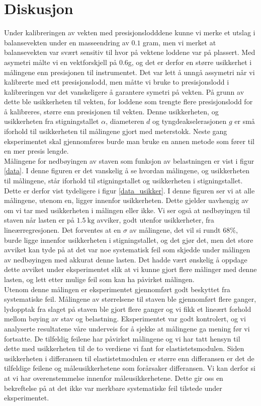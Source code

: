 \documentclass[%
 reprint,
 amsmath,amssymb,
 aps,
 norsk,
 booktabs
]{revtex4-1}
\begin{document}
\section{Diskusjon}
Under kalibreringen av vekten med presisjonslodddene kunne vi merke et utslag i balansevekten under en masseendring av $0.1$ gram, men vi merket at balansevekten var svært sensitiv til hvor på vektene loddene var på plassert. Med asymetri målte vi en vektforskjell på $0.6$g, og det er derfor en større usikkerhet i målingene enn presisjonen til instrumentet. Det var lett å unngå assymetri når vi kalibrerte med ett presisjonslodd, men måtte vi bruke to presisjonslodd i kalibreringen var det vanskeligere å garantere symetri på vekten. På grunn av dette ble usikkerheten til vekten, for loddene som trengte flere presisjonslodd for å kalibreres, større enn presisjonen til vekten. Denne usikkerheten, og usikkerheten fra stigningstallet $\alpha$, diameteren $d$ og tyngdeakselerasjonen $g$ er små iforhold til usikkerheten til målingene gjort med meterstokk. Neste gang eksperimentet skal gjennomføres burde man bruke en annen metode som fører til en mer presis lengde.\\
Målingene for nedbøyingen av staven som funksjon av belastningen er vist i figur \vref{data}. I denne figuren er det vanskelig å se hvordan målingene, og usikkerheten til målingene, står iforhold til stigningstallet og usikkerheten i stigningstallet. Dette er derfor vist tydeligere i figur \vref{data_usikker}. I denne figuren ser vi at alle målingene, utenom en, ligger innenfor usikkerheten. Dette gjelder uavhengig av om vi tar med usikkerheten i målingen eller ikke. Vi ser også at nedbøyingen til staven når lasten er på $\SI{1.5}{\kilo\gram}$ avviker, godt utenfor usikkerheter, fra lineærregresjonen. Det forventes at en $\sigma$ av målingene, det vil si rundt $68\%$, burde ligge innenfor usikkerheten i stigningstallet, og det gjør det, men det store avviket kan tyde på at det var noe systematisk feil som skjedde under målingen av nedbøyingen med akkurat denne lasten. Det hadde vært ønskelig å oppdage dette avviket under eksperimentet slik at vi kunne gjort flere målinger med denne lasten, og lett etter mulige feil som kan ha påvirket målingen.\\
Utenom denne målingen er eksperimentet gjennomført godt beskyttet fra systematiske feil. Målingene av størrelsene til staven ble gjennomført flere ganger, lydopptak fra slaget på staven ble gjort flere ganger og vi fikk et lineært forhold mellom bøying av stav og belastning. Eksperimentet var godt kontrolert, og vi analyserte resultatene våre underveis for å sjekke at målingene ga mening før vi fortsatte. De tilfeldig feilene har påvirket målingene og vi har tatt hensyn til dette med usikkerheten til de to verdiene vi fant for elastistetsmodulen. Siden usikkerheten i differansen til elastistetmodulen er større enn differansen er det de tilfeldige feilene og måleusikkerhetene som forårsaker differansen. Vi kan derfor si at vi har overenstemmelse innenfor måleusikkerhetene. Dette gir oss en bekreftelse på at det ikke var merkbare systematiske feil tilstede under eksperimentet.
\end{document}
